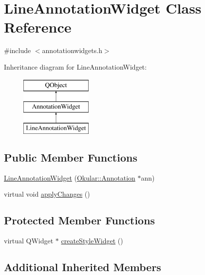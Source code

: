 \hypertarget{classLineAnnotationWidget}{\section{Line\+Annotation\+Widget Class Reference}
\label{classLineAnnotationWidget}
}


{\ttfamily \#include $<$annotationwidgets.\+h$>$}

Inheritance diagram for Line\+Annotation\+Widget\+:\begin{figure}[H]
\begin{center}
\leavevmode
\includegraphics[height=3.000000cm]{classLineAnnotationWidget}
\end{center}
\end{figure}
\subsection*{Public Member Functions}
\begin{DoxyCompactItemize}
\item 
\hyperlink{classLineAnnotationWidget_a528018c048420a205b8ea284a469ee90}{Line\+Annotation\+Widget} (\hyperlink{classOkular_1_1Annotation}{Okular\+::\+Annotation} $\ast$ann)
\item 
virtual void \hyperlink{classLineAnnotationWidget_a31b65c29b709f901c8b706ab2de42846}{apply\+Changes} ()
\end{DoxyCompactItemize}
\subsection*{Protected Member Functions}
\begin{DoxyCompactItemize}
\item 
virtual Q\+Widget $\ast$ \hyperlink{classLineAnnotationWidget_ae034334b44224792130e0677510a1f65}{create\+Style\+Widget} ()
\end{DoxyCompactItemize}
\subsection*{Additional Inherited Members}



